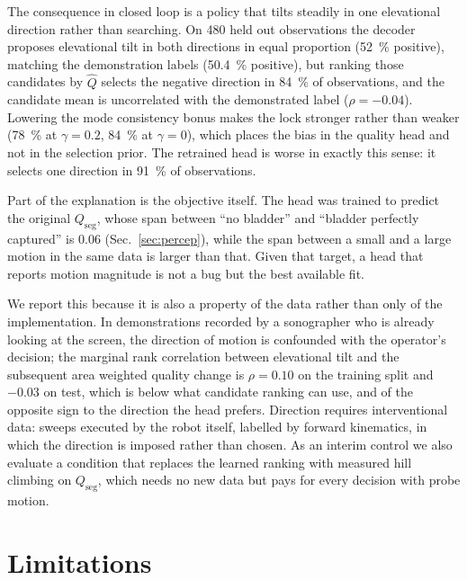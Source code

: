 \documentclass[conference]{IEEEtran}
\begin{document}
The consequence in closed loop is a policy that tilts steadily in one
elevational direction rather than searching. On 480 held out observations the
decoder proposes elevational tilt in both directions in equal proportion
(\SI{52}{\percent} positive), matching the demonstration labels
(\SI{50.4}{\percent} positive), but ranking those candidates by $\hat Q$ selects
the negative direction in \SI{84}{\percent} of observations, and the candidate
mean is uncorrelated with the demonstrated label ($\rho = \num{-0.04}$).
Lowering the mode consistency bonus makes the lock stronger rather than weaker
(\SI{78}{\percent} at $\gamma = \num{0.2}$, \SI{84}{\percent} at
$\gamma = 0$), which places the bias in the quality head and not in the
selection prior. The retrained head is worse in exactly this sense: it selects
one direction in \SI{91}{\percent} of observations.

Part of the explanation is the objective itself. The head was trained to predict
the original $Q_\mathrm{seg}$, whose span between ``no bladder'' and ``bladder
perfectly captured'' is \num{0.06} (Sec.~\ref{sec:percep}), while the span
between a small and a large motion in the same data is larger than that. Given
that target, a head that reports motion magnitude is not a bug but the best
available fit.

We report this because it is also a property of the data rather than only of the
implementation. In demonstrations recorded by a sonographer who is already
looking at the screen, the direction of motion is confounded with the operator's
decision; the marginal rank correlation between elevational tilt and the
subsequent area weighted quality change is $\rho = \num{+0.10}$ on the training
split and $\num{-0.03}$ on test, which is below what candidate ranking can use,
and of the opposite sign to the direction the head prefers. Direction requires
interventional data: sweeps executed by the robot itself, labelled by forward
kinematics, in which the direction is imposed rather than chosen. As an interim
control we also evaluate a condition that replaces the learned ranking with
measured hill climbing on $Q_\mathrm{seg}$, which needs no new data but pays for
every decision with probe motion.

\section{Limitations}
\label{sec:limits}
\end{document}
